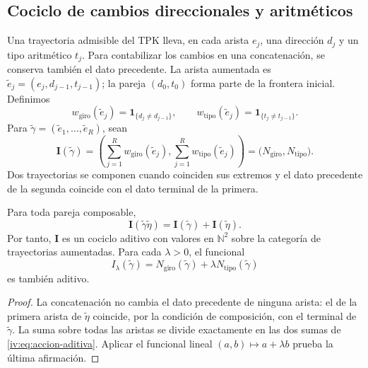 \subsection{Cociclo de cambios direccionales y aritméticos}

Una trayectoria admisible del TPK lleva, en cada arista
\(e_j\), una dirección \(d_j\) y un tipo aritmético
\(t_j\). Para contabilizar los cambios en una concatenación,
se conserva también el dato precedente. La arista aumentada es
\(\widetilde e_j=(e_j,d_{j-1},t_{j-1})\); la pareja
\((d_0,t_0)\) forma parte de la frontera inicial. Definimos
\[
 w_{\mathrm{giro}}(\widetilde e_j)
       =\mathbf1_{\{d_j\ne d_{j-1}\}},\qquad
 w_{\mathrm{tipo}}(\widetilde e_j)
       =\mathbf1_{\{t_j\ne t_{j-1}\}}.
\]
Para \(\widetilde\gamma=(\widetilde e_1,\ldots,
\widetilde e_R)\), sean
\begin{equation}
 \mathbf I(\widetilde\gamma)=
 \left(\sum_{j=1}^R w_{\mathrm{giro}}(\widetilde e_j),
       \sum_{j=1}^R w_{\mathrm{tipo}}(\widetilde e_j)\right)
 =\bigl(N_{\mathrm{giro}},N_{\mathrm{tipo}}\bigr).
 \label{iv:eq:cociclo-accion}
\end{equation}
Dos trayectorias se componen cuando coinciden sus extremos
y el dato precedente de la segunda coincide con el dato
terminal de la primera.

\begin{proposition}
\label{iv:prop:accion-aditiva}
Para toda pareja composable,
\begin{equation}
 \mathbf I(\widetilde\gamma\widetilde\eta)
 =\mathbf I(\widetilde\gamma)+\mathbf I(\widetilde\eta).
 \label{iv:eq:accion-aditiva}
\end{equation}
Por tanto, \(\mathbf I\) es un cociclo aditivo con valores
en \(\mathbb N^2\) sobre la categoría de trayectorias
aumentadas. Para cada \(\lambda>0\), el funcional
\[
 I_\lambda(\widetilde\gamma)
 =N_{\mathrm{giro}}(\widetilde\gamma)
      +\lambda N_{\mathrm{tipo}}(\widetilde\gamma)
\]
es también aditivo.
\end{proposition}
\begin{proof}
La concatenación no cambia el dato precedente de ninguna
arista: el de la primera arista de \(\widetilde\eta\)
coincide, por la condición de composición, con el terminal
de \(\widetilde\gamma\). La suma sobre todas las aristas
se divide exactamente en las dos sumas de
\eqref{iv:eq:accion-aditiva}. Aplicar el funcional lineal
\((a,b)\mapsto a+\lambda b\) prueba la última afirmación.
\end{proof}

